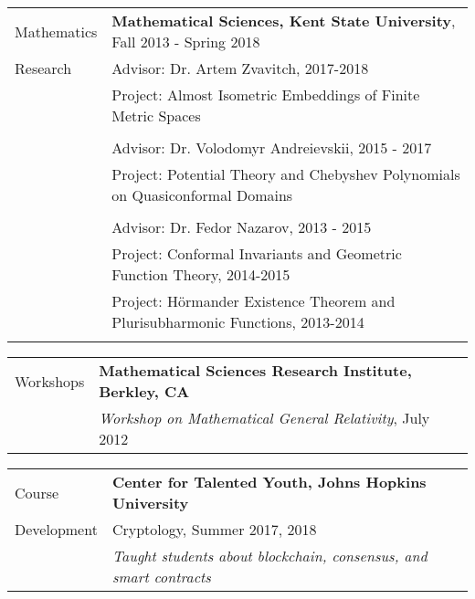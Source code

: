 \documentclass[letterpaper,10pt,oneside]{article}
\begin{document}
\noindent \begin{tabular}{@{} l l}
 \Large{Mathematics} & \textbf{Mathematical Sciences, Kent State University}, Fall 2013 - Spring 2018 \\
 \Large{Research} & Advisor: Dr. Artem Zvavitch, 2017-2018 \\
 \hspace{1.1in} & Project: Almost Isometric Embeddings of Finite Metric Spaces \\
 & \\
 & Advisor: Dr. Volodomyr Andreievskii, 2015 - 2017 \\
 & Project: Potential Theory and Chebyshev Polynomials on Quasiconformal Domains \\
 & \\
 & Advisor: Dr. Fedor Nazarov, 2013 - 2015 \\
 & Project: Conformal Invariants and Geometric Function Theory, 2014-2015 \\
 & Project: H\"{o}rmander Existence Theorem and Plurisubharmonic Functions, 2013-2014 \\
 & \\
\end{tabular}

\vfill

\newpage


\noindent \begin{tabular}{@{} l l}
 \Large{Workshops} & \textbf{Mathematical Sciences Research Institute, Berkley, CA} \\
 \hspace{1.1in} & \emph{Workshop on Mathematical General Relativity}, July 2012 \\
\end{tabular}

\vfill


\noindent \begin{tabular}{@{} l l}
 \Large{Course} & \textbf{Center for Talented Youth, Johns Hopkins University} \\
 \Large{Development} & Cryptology, Summer 2017, 2018 \\
 \hspace{1.1in} & \emph{Taught students about blockchain, consensus, and smart contracts} \\
\end{tabular}
\end{document}
